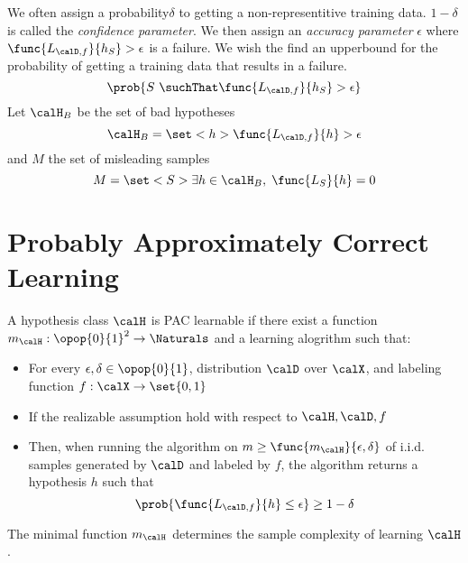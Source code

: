 We often assign a probability\(\delta\) to getting a non-representitive training data. \(1- \delta\) is called the \textit{confidence parameter}. We then assign an \textit{accuracy parameter} \(\epsilon\) where \(\func{L_{\calD, f}}{h_S} > \epsilon\) is a failure. We wish the find an upperbound for the probability of getting a training data that results in a failure. 
\begin{equation*}
    \prob{S \ \suchThat \func{L_{\calD, f}}{h_S} > \epsilon}
\end{equation*}
Let \(\calH_B\) be the set of bad hypotheses
\begin{equation*}
    \calH_B = \set<h>{\func{L_{\calD, f}}{h} > \epsilon}
\end{equation*}
and \(M\) the set of misleading samples 
\begin{equation*}
    M = \set<S>{\exists h \in \calH_B, \; \func{L_{S}}{h} = 0}
\end{equation*}

\chapter{Probably Approximately Correct Learning}

\begin{definition}
    A hypothesis class \(\calH\) is PAC learnable if there exist a function \(m_{\calH} : \opop{0}{1}^2 \to \Naturals\) and a learning alogrithm such that:
    \begin{itemize}
        \item For every \(\epsilon,\delta \in \opop{0}{1}\), distribution \(\calD\) over \(\calX\), and labeling function \(f: \calX \to \set{0,1}\)
        \item If the realizable assumption hold with respect to \(\calH,\calD,f\)
        \item Then, when running the algorithm on \(m \geq \func{m_{\calH}}{\epsilon,\delta}\) of i.i.d. samples generated by \(\calD\) and labeled by \(f\), the algorithm returns a hypothesis \(h\) such that 
        \begin{equation*}
            \prob{\func{L_{\calD, f}}{h} \leq \epsilon} \geq 1- \delta
        \end{equation*}
    \end{itemize}
\end{definition}
\begin{remark}
    The minimal function \(m_{\calH}\) determines the sample complexity of learning \(\calH\).
\end{remark}

